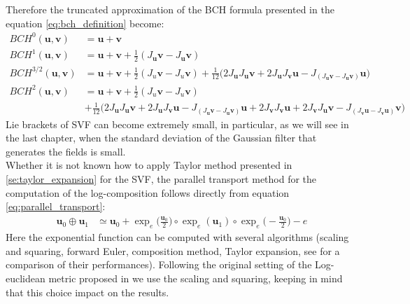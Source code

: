 Therefore the truncated approximation of the BCH formula presented in the equation \ref{eq:bch_definition} become:
\begin{align*}
BCH^{0}(\mathbf{u},\mathbf{v}) &= \mathbf{u} + \mathbf{v} \\
BCH^{1}(\mathbf{u},\mathbf{v}) &=  \mathbf{u} + \mathbf{v} + \frac{1}{2}(J_{\mathbf{u}}\mathbf{v} - J_{\mathbf{u}}\mathbf{v})\\
BCH^{3/2}(\mathbf{u},\mathbf{v}) 
&=  
\mathbf{u} + \mathbf{v} + \frac{1}{2}(J_{u}\mathbf{v} - J_{u}\mathbf{v}) + 
\frac{1}{12}\big( 
2 J_{\mathbf{u}} J_{\mathbf{u}}\mathbf{v} +2 J_{\mathbf{u}} J_{\mathbf{v}}\mathbf{u}
- 
J_{(J_{\mathbf{u}}\mathbf{v} - J_{\mathbf{u}}\mathbf{v})}\mathbf{u} 
\big) 
\\
BCH^{2}(\mathbf{u},\mathbf{v}) 
&=  
\mathbf{u} + \mathbf{v} + \frac{1}{2}(J_{u}\mathbf{v} - J_{u}\mathbf{v}) 
\\
&+ 
\frac{1}{12}\big( 
2 J_{\mathbf{u}} J_{\mathbf{u}}\mathbf{v} +2 J_{\mathbf{u}} J_{\mathbf{v}}\mathbf{u}
- 
J_{(J_{\mathbf{u}}\mathbf{v} - J_{\mathbf{u}}\mathbf{v})}\mathbf{u} 
+
2 J_{\mathbf{v}} J_{\mathbf{v}}\mathbf{u} +2 J_{\mathbf{v}} J_{\mathbf{u}}\mathbf{v}
- 
J_{(J_{\mathbf{v}}\mathbf{u} - J_{\mathbf{v}}\mathbf{u})}\mathbf{v} 
\big) 
\end{align*}
Lie brackets of SVF can become extremely small, in particular, as we will see in the last chapter, when the standard deviation of the Gaussian filter that generates the fields is small. \\
Whether it is not known how to apply Taylor method presented in \ref{se:taylor_expansion} for the SVF, the parallel transport method for the computation of the log-composition follows directly from equation  \ref{eq:parallel_transport}:
\begin{align*}
\mathbf{u}_0\oplus \mathbf{u}_1
&\simeq
\mathbf{u}_0 
+
\exp_{e}\big(\frac{\mathbf{u}_0}{2}\big)   
\circ  \exp_{e}(\mathbf{u}_1) 
\circ \exp_{e}\big(-\frac{\mathbf{u}_0}{2}\big)
-
e
\end{align*}
Here the exponential function can be computed with several algorithms (scaling and squaring, forward Euler, composition method, Taylor expansion, see \cite{bossa2008algorithms} for a comparison of their performances). Following the original setting of the Log-euclidean metric proposed in \cite{arsigny2006log} we use the scaling and squaring, keeping in mind that this choice impact on the results.
